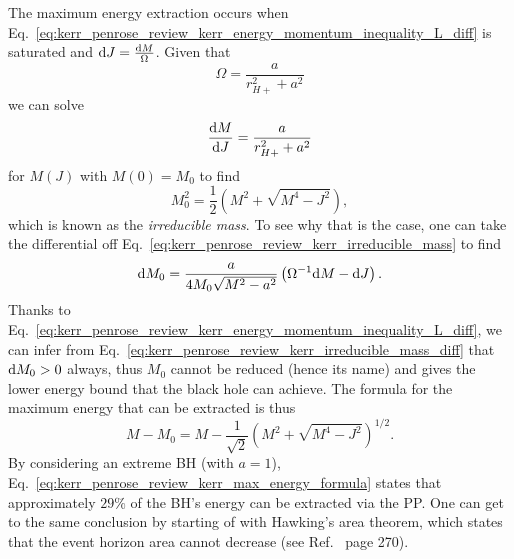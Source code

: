 The maximum energy extraction occurs when Eq.~\eqref{eq:kerr_penrose_review_kerr_energy_momentum_inequality_L_diff} is saturated and $\mathrm{d} J = \frac{\mathrm{d} M}{\Omega}$. Given that
%
\begin{equation}
  \Omega = \frac{a}{r_{H+}^2 + a^2}
  \label{eq:kerr_penrose_review_kerr_angular_momentum_def}
\end{equation}
%
we can solve
%
\begin{equation}
  \frac{\mathrm{d} M}{\mathrm{d} J} = \frac{a}{r_{H+}^2 + a^2}
  \label{eq:kerr_penrose_review_kerr_mass_ODE}
\end{equation}
%
for $M(J)$ with $M(0) = M_0$ to find
%
\begin{equation}
  M_0^2 = \frac{1}{2}\left( M^2 + \sqrt{M^4 - J^2} \right),
  \label{eq:kerr_penrose_review_kerr_irreducible_mass}
\end{equation}
%
which is known as the \emph{irreducible mass}. To see why that is the case, one can take the differential off Eq.~\eqref{eq:kerr_penrose_review_kerr_irreducible_mass} to find
%
\begin{equation}
  \mathrm{d} M_0 = \frac{a}{4 M_0 \sqrt{M^2 - a^2}}\left( \Omega^{-1} \mathrm{d} M - \mathrm{d} J \right).
  \label{eq:kerr_penrose_review_kerr_irreducible_mass_diff}
\end{equation}
%
Thanks to Eq.~\eqref{eq:kerr_penrose_review_kerr_energy_momentum_inequality_L_diff}, we can infer from Eq.~\eqref{eq:kerr_penrose_review_kerr_irreducible_mass_diff} that $\mathrm{d} M_0 > 0$ always, thus $M_0$ cannot be reduced (hence its name) and gives the lower energy bound that the black hole can achieve. The formula for the maximum energy that can be extracted is thus
%
\begin{equation}
  M - M_0 = M - \frac{1}{\sqrt{2}}\left( M^2 + \sqrt{M^4 - J^2} \right)^{1/2}.
  \label{eq:kerr_penrose_review_kerr_max_energy_formula}
\end{equation}
%
By considering an extreme \ac{BH} (with $a=1$), Eq.~\eqref{eq:kerr_penrose_review_kerr_max_energy_formula} states that approximately $29\%$ of the \ac{BH}'s energy can be extracted via the \ac{PP}. One can get to the same conclusion by starting of with Hawking's area theorem, which states that the event horizon area cannot decrease (see Ref.~\cite{carroll} page 270).
